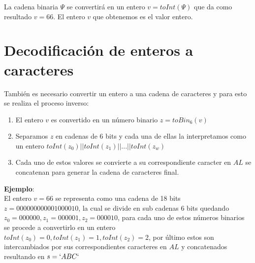 La cadena binaria $\Psi$ se convertirá en un entero $v=toInt(\Psi )$ que da como resultado $v=66$. El entero $v$ que obtenemos es el valor entero.

\section{Decodificación de enteros a caracteres}

También es necesario convertir un entero a una cadena de caracteres y para esto se realiza el proceso inverso:
\begin{enumerate}
 \item El entero $v$ es convertido en un número binario  $z=toBin_6(v)$ 
 \item Separamos $z$ en cadenas de 6 bits y cada una de ellas la interpretamos como un entero $toInt(z_0)||toInt(z_1)||...||toInt(z_w)$
 \item Cada uno de estos valores se convierte a su correspondiente caracter en $AL$ se concatenan para generar la cadena de caracteres final.
\end{enumerate}
\textbf{Ejemplo}:\\
El entero $v=66$ se representa como una cadena de 18 bits $z=000000000001000010$, la cual se divide en sub cadenas 6 bits quedando $z_0=000000, z_1=000001, z_2=000010$, para cada uno de estos números binarios se procede a convertirlo en un entero $toInt(z_0)=0, toInt(z_1)=1, toInt(z_2)=2$, por último estos son intercambiados por sus correspondientes caracteres en $AL$ y concatenados resultando en $s=`ABC`$


